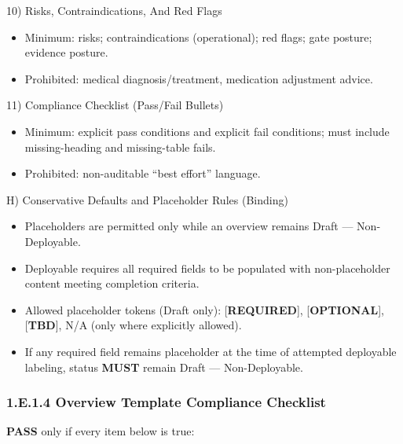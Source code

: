 \documentclass[10pt]{article}
\begin{document}
10) Risks, Contraindications, And Red Flags

\begin{itemize}
\item Minimum: risks; contraindications (operational); red flags; gate posture; evidence posture.
\item Prohibited: medical diagnosis/treatment, medication adjustment advice.
\end{itemize}

11) Compliance Checklist (Pass/Fail Bullets)

\begin{itemize}
\item Minimum: explicit pass conditions and explicit fail conditions; must include missing-heading and missing-table fails.
\item Prohibited: non-auditable “best effort” language.
\end{itemize}

H) Conservative Defaults and Placeholder Rules (Binding)

\begin{itemize}
\item Placeholders are permitted only while an overview remains Draft — Non-Deployable.
\item Deployable requires all required fields to be populated with non-placeholder content meeting completion criteria.
\item Allowed placeholder tokens (Draft only): [\textbf{REQUIRED}], [\textbf{OPTIONAL}], [\textbf{TBD}], N/A (only where explicitly allowed).
\item If any required field remains placeholder at the time of attempted deployable labeling, status \textbf{MUST} remain Draft — Non-Deployable.
\end{itemize}

\subsubsection*{1.E.1.4 Overview Template Compliance Checklist}

\textbf{PASS} only if every item below is true:
\end{document}
